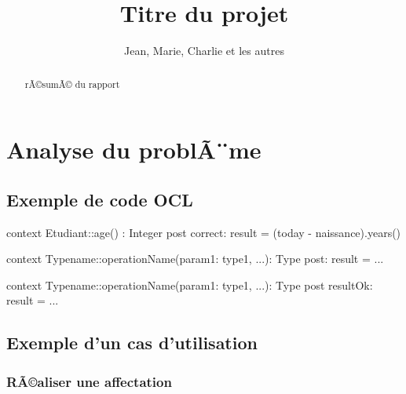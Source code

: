 \documentclass[a4paper, french, 10pt]{report}
\title{Titre du projet}
\author{Jean, Marie, Charlie et les autres}
\date{}
\begin{document}
\maketitle

\begin{abstract}
	rÃ©sumÃ© du rapport
\end{abstract}
 
\tableofcontents
 

\chapter{Analyse du problÃ¨me}
 
\section{Exemple de code OCL}
\begin{ocl}
context Etudiant::age() : Integer
post correct: result = (today - naissance).years()

context Typename::operationName(param1: type1, ...): Type
post: result = ...

context Typename::operationName(param1: type1, ...): Type
post resultOk: result = ...
\end{ocl}

\section{Exemple d'un cas d'utilisation}

\subsection{RÃ©aliser une affectation}
\end{document}
